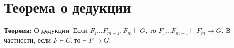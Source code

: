 \documentclass[../main.tex]{subfiles}
\begin{document}
\section{Теорема о дедукции}
\textbf{Теорема:
} О дедукции: Если $F_1\ldots F_{m-1},F_m\vdash G$, то $F_1\ldots F_{m-1}\vdash F_m\to G$. В частности, если $F\vdash G, то \vdash F\to G$. \\
\end{document}
